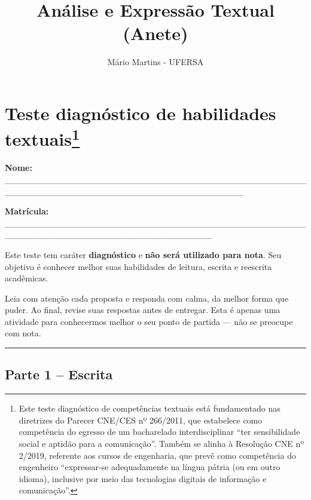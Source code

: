 \documentclass[
  12pt,
]{article}
\title{Análise e Expressão Textual (Anete)}
\author{Mário Martins - UFERSA}
\date{}
\begin{document}
\maketitle

\section[Teste diagnóstico de habilidades
textuais]{\texorpdfstring{Teste diagnóstico de habilidades
textuais\footnote{Este teste diagnóstico de competências textuais está
  fundamentado nas diretrizes do Parecer CNE/CES nº 266/2011, que
  estabelece como competência do egresso de um bacharelado
  interdisciplinar ``ter sensibilidade social e aptidão para a
  comunicação''. Também se alinha à Resolução CNE nº 2/2019, referente
  aos cursos de engenharia, que prevê como competência do engenheiro
  ``expressar-se adequadamente na língua pátria (ou em outro idioma),
  inclusive por meio das tecnologias digitais de informação e
  comunicação''.}}{Teste diagnóstico de habilidades textuais}}\label{teste-diagnuxf3stico-de-habilidades-textuais1}

\vspace{1.0cm}

\textbf{Nome:}
\_\_\_\_\_\_\_\_\_\_\_\_\_\_\_\_\_\_\_\_\_\_\_\_\_\_\_\_\_\_\_\_\_\_\_\_\_\_\_\_\_\_\_\_\_\_\_\_\_\_\_\_\_\_\_\_\_\_\_\_\_\_\_\_\_\_\_\_\_\_\_\_\_\_\_\_\_\_\_\_\_\_\_\_\_\_\\
\vspace{0.5cm}

\textbf{Matrícula:}
\_\_\_\_\_\_\_\_\_\_\_\_\_\_\_\_\_\_\_\_\_\_\_\_\_\_\_\_\_\_\_\_\_\_\_\_\_\_\_\_\_\_\_\_\_\_\_\_\_\_\_\_\_\_\_\_\_\_\_\_\_\_\_\_\_\_\_\_\_\_\_\_\_\_\_\_\_\_\_\_\_\\
\vspace{0.5cm}

Este teste tem caráter \textbf{diagnóstico} e \textbf{não será utilizado
para nota}. Seu objetivo é conhecer melhor suas habilidades de leitura,
escrita e reescrita acadêmicas.

Leia com atenção cada proposta e responda com calma, da melhor forma que
puder. Ao final, revise suas respostas antes de entregar. Esta é apenas
uma atividade para conhecermos melhor o seu ponto de partida --- não se
preocupe com nota.

\begin{center}\rule{0.5\linewidth}{0.5pt}\end{center}

\subsection{Parte 1 -- Escrita}\label{parte-1-escrita}
\end{document}
